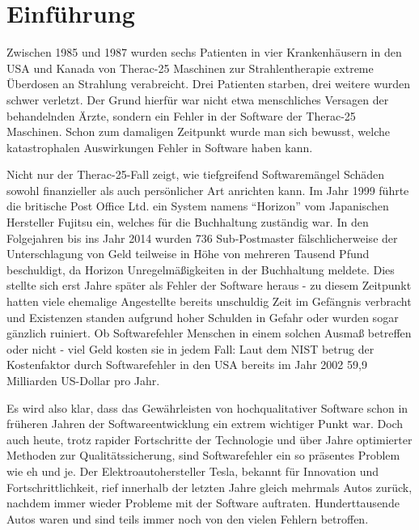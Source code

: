 \chapter{Einführung}\label{ch:einfuehrung}
Zwischen 1985 und 1987 wurden sechs Patienten in vier Krankenhäusern in den USA und Kanada von Therac-25 Maschinen zur Strahlentherapie extreme Überdosen an Strahlung verabreicht. Drei Patienten starben, drei weitere wurden schwer verletzt. Der Grund hierfür war nicht etwa menschliches Versagen der behandelnden Ärzte, sondern ein Fehler in der Software der Therac-25 Maschinen. \cite[S. 425]{baase:2008} Schon zum damaligen Zeitpunkt wurde man sich bewusst, welche katastrophalen Auswirkungen Fehler in Software haben kann. 

Nicht nur der Therac-25-Fall zeigt, wie tiefgreifend Softwaremängel Schäden sowohl finanzieller als auch persönlicher Art anrichten kann. Im Jahr 1999 führte die britische Post Office Ltd. ein System namens \enquote{Horizon} vom Japanischen Hersteller Fujitsu ein, welches für die Buchhaltung zuständig war. In den Folgejahren bis ins Jahr 2014 wurden 736 Sub-Postmaster fälschlicherweise der Unterschlagung von Geld teilweise in Höhe von mehreren Tausend Pfund beschuldigt, da Horizon Unregelmäßigkeiten in der Buchhaltung meldete. Dies stellte sich erst Jahre später als Fehler der Software heraus - zu diesem Zeitpunkt hatten viele ehemalige Angestellte bereits unschuldig Zeit im Gefängnis verbracht und Existenzen standen aufgrund hoher Schulden in Gefahr oder wurden sogar gänzlich ruiniert. \cite{bbc:2022} Ob Softwarefehler Menschen in einem solchen Ausmaß betreffen oder nicht - viel Geld kosten sie in jedem Fall: Laut dem \ac{NIST} betrug der Kostenfaktor durch Softwarefehler in den USA bereits im Jahr 2002 59,9 Milliarden US-Dollar pro Jahr. \cite{nist:2002}

Es wird also klar, dass das Gewährleisten von hochqualitativer Software schon in früheren Jahren der Softwareentwicklung ein extrem wichtiger Punkt war. Doch auch heute, trotz rapider Fortschritte der Technologie und über Jahre optimierter Methoden zur Qualitätssicherung, sind Softwarefehler ein so präsentes Problem wie eh und je. Der Elektroautohersteller Tesla, bekannt für Innovation und Fortschrittlichkeit, rief innerhalb der letzten Jahre gleich mehrmals Autos zurück, nachdem immer wieder Probleme mit der Software auftraten. Hunderttausende Autos waren und sind teils immer noch von den vielen Fehlern betroffen. \cite{kbb:2022}

